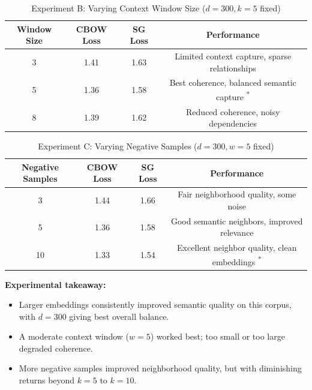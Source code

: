 \documentclass[11pt,a4paper]{article}
\begin{document}
\begin{table}[H]
\centering
\caption{Experiment B: Varying Context Window Size ($d=300, k=5$ fixed)}
\small
\begin{tabular}{c c c c}
\toprule
\textbf{Window Size} & \textbf{CBOW Loss} & \textbf{SG Loss} & \textbf{Performance} \\
\midrule
3 & 1.41 & 1.63 & Limited context capture, sparse relationships \\
5 & 1.36 & 1.58 & Best coherence, balanced semantic capture \textsuperscript{*} \\
8 & 1.39 & 1.62 & Reduced coherence, noisy dependencies \\
\bottomrule
\end{tabular}
\end{table}

\begin{table}[H]
\centering
\caption{Experiment C: Varying Negative Samples ($d=300, w=5$ fixed)}
\small
\begin{tabular}{c c c c}
\toprule
\textbf{Negative Samples} & \textbf{CBOW Loss} & \textbf{SG Loss} & \textbf{Performance} \\
\midrule
3  & 1.44 & 1.66 & Fair neighborhood quality, some noise \\
5  & 1.36 & 1.58 & Good semantic neighbors, improved relevance \\
10 & 1.33 & 1.54 & Excellent neighbor quality, clean embeddings \textsuperscript{*} \\
\bottomrule
\end{tabular}
\end{table}

\textbf{Experimental takeaway:}
\begin{itemize}[leftmargin=1.5em]
    \item Larger embeddings consistently improved semantic quality on this corpus, with $d=300$ giving best overall balance.
    \item A moderate context window ($w=5$) worked best; too small or too large degraded coherence.
    \item More negative samples improved neighborhood quality, but with diminishing returns beyond $k=5$ to $k=10$.
\end{itemize}

\end{document}

